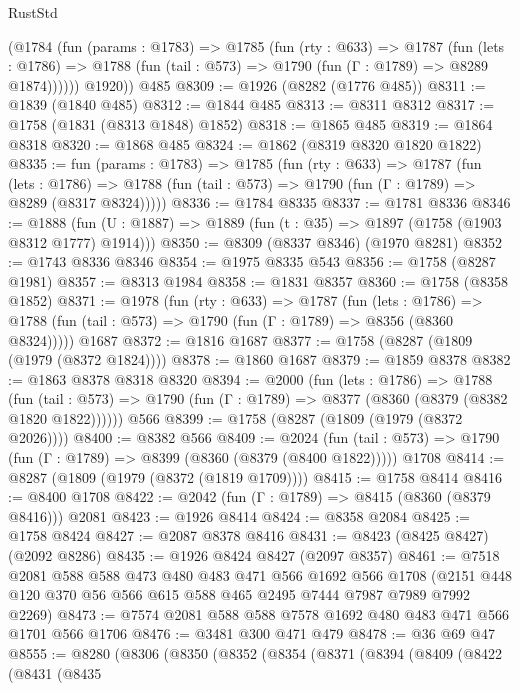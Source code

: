 \begin{lexlean}{RustStd}
\begin{coremodule}
{\begin{coremodule}
{{{{{{{{{{{{{{{        (@1784
          (fun (params : @1783) =>
          @1785
            (fun (rty : @633) =>
            @1787
              (fun (lets : @1786) =>
              @1788 (fun (tail : @573) => @1790 (fun (Γ : @1789) => @8289 @1874))))))
        @1920))
    @485
@8309 := @1926 (@8282 (@1776 @485))
@8311 := @1839 (@1840 @485)
@8312 := @1844 @485
@8313 := @8311 @8312
@8317 := @1758 (@1831 (@8313 @1848) @1852)
@8318 := @1865 @485
@8319 := @1864 @8318
@8320 := @1868 @485
@8324 := @1862 (@8319 @8320 @1820 @1822)
@8335 := fun (params : @1783) =>
  @1785
    (fun (rty : @633) =>
    @1787
      (fun (lets : @1786) =>
      @1788 (fun (tail : @573) => @1790 (fun (Γ : @1789) => @8289 (@8317 @8324)))))
@8336 := @1784 @8335
@8337 := @1781 @8336
@8346 := @1888 (fun (U : @1887) => @1889 (fun (t : @35) => @1897 (@1758 (@1903 @8312 @1777) @1914)))
@8350 := @8309 (@8337 @8346) (@1970 @8281)
@8352 := @1743 @8336 @8346
@8354 := @1975 @8335 @543
@8356 := @1758 (@8287 @1981)
@8357 := @8313 @1984
@8358 := @1831 @8357
@8360 := @1758 (@8358 @1852)
@8371 := @1978
    (fun (rty : @633) =>
    @1787
      (fun (lets : @1786) =>
      @1788 (fun (tail : @573) => @1790 (fun (Γ : @1789) => @8356 (@8360 @8324)))))
    @1687
@8372 := @1816 @1687
@8377 := @1758 (@8287 (@1809 (@1979 (@8372 @1824))))
@8378 := @1860 @1687
@8379 := @1859 @8378
@8382 := @1863 @8378 @8318 @8320
@8394 := @2000
    (fun (lets : @1786) =>
    @1788
      (fun (tail : @573) => @1790 (fun (Γ : @1789) => @8377 (@8360 (@8379 (@8382 @1820 @1822))))))
    @566
@8399 := @1758 (@8287 (@1809 (@1979 (@8372 @2026))))
@8400 := @8382 @566
@8409 := @2024
    (fun (tail : @573) => @1790 (fun (Γ : @1789) => @8399 (@8360 (@8379 (@8400 @1822)))))
    @1708
@8414 := @8287 (@1809 (@1979 (@8372 (@1819 @1709))))
@8415 := @1758 @8414
@8416 := @8400 @1708
@8422 := @2042 (fun (Γ : @1789) => @8415 (@8360 (@8379 @8416))) @2081
@8423 := @1926 @8414
@8424 := @8358 @2084
@8425 := @1758 @8424
@8427 := @2087 @8378 @8416
@8431 := @8423 (@8425 @8427) (@2092 @8286)
@8435 := @1926 @8424 @8427 (@2097 @8357)
@8461 := @7518
    @2081
    @588
    @588
    @473
    @480
    @483
    @471
    @566
    @1692
    @566
    @1708
    (@2151 @448 @120 @370 @56 @566 @615 @588 @465 @2495 @7444 @7987 @7989 @7992 @2269)
@8473 := @7574 @2081 @588 @588 @7578 @1692 @480 @483 @471 @566 @1701 @566 @1706
@8476 := @3481 @300 @471 @479
@8478 := @36 @69 @47
@8555 := @8280
    (@8306
      (@8350
        (@8352
          (@8354
            (@8371
              (@8394
                (@8409
                  (@8422
                    (@8431
                      (@8435
}}}}}}}}}}}}}}}
\end{coremodule}}
\end{coremodule}
\end{lexlean}
